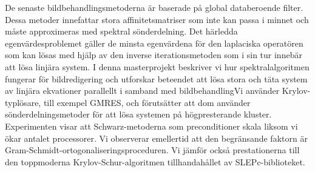 De senaste bildbehandlingsmetoderna är baserade på global databeroende filter.
Dessa metoder innefattar stora affinitetsmatriser som inte kan passa i minnet och måste approximeras med spektral sönderdelning.
Det härledda egenvärdesproblemet gäller de minsta egenvärdena för den laplaciska operatören som kan lösas med hjälp av den inverse iterationsmetoden som i sin tur innebär att lösa linjära system.
I denna masterprojekt beskriver vi hur spektralalgoritmen fungerar för bildredigering och utforskar beteendet att lösa stora och täta system av linjära ekvationer parallellt i samband med bildbehandlingVi använder Krylov-typlösare, till exempel GMRES, och förutsätter att dom använder sönderdelningsmetoder för att lösa systemen på högpresterande kluster.
Experimenten visar att Schwarz-metoderna som preconditioner skala liksom vi ökar antalet processorer.
Vi observerar emellertid att den begränsande faktorn är Gram-Schmidt-ortogonaliseringsproceduren.
Vi jämför också prestationerna till den toppmoderna Krylov-Schur-algoritmen tillhandahållet av SLEPc-biblioteket.
